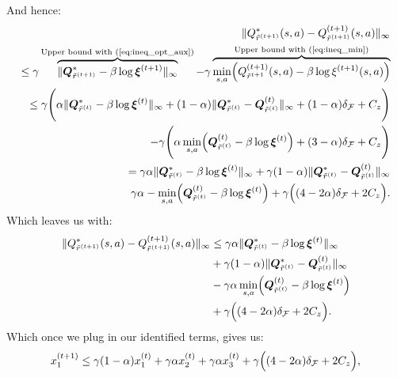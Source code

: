     And hence:
    \begin{align*}
        \| Q^*_{\tilde{r}^{(t+1)}}(s,a)
        -Q^{(t+1)}_{\tilde{r}^{(t+1)}}(s,a) \|_\infty \\
        \leq \gamma \overbrace{\| \bm{Q}_{\tilde{r}^{(t+1)}}^* - \beta \log \bm{\xi}^{(t+1)} \|_\infty }^\text{Upper bound with (\ref{eq:ineq_opt_aux})}
        - \gamma \overbrace{\min_{s,a} \Bigl(
            Q^{(t+1)}_{\tilde{r}^{t+1}}(s,a) - \beta \log \xi^{(t+1)}(s,a)
        \Bigr)}^\text{Upper bound with (\ref{eq:ineq_min})}\\
        \leq \gamma
        \Biggl(
            \alpha  \| \bm{Q}_{\tilde{r}^{(t)}}^* - \beta \log \bm{\xi}^{(t)} \|_\infty 
            + (1-\alpha) \|
                \bm{Q}_{\tilde{r}^{(t)}}^*  
                - {\bm{Q}}^{(t)}_{\tilde{r}^{(t)}} \|_\infty  
            + (1-\alpha) \delta_\mathcal{F} + C_z
        \Biggr) \\
        - \gamma \Biggl(
            \alpha \min_{s,a} \Bigl(\bm{Q}^{(t)}_{\tilde{r}^{(t)}} - \beta \log \bm{\xi}^{(t)}  \Bigr) + 
            (3-\alpha) \delta_\mathcal{F} + C_z    
        \Biggr) \\
        =
        \gamma \alpha \| \bm{Q}_{\tilde{r}^{(t)}}^* 
        - \beta \log \bm{\xi}^{(t)} \|_\infty 
        +\gamma(1-\alpha) \| \bm{Q}_{\tilde{r}^{(t)}}^*  
        - {\bm{Q}}^{(t)}_{\tilde{r}^{(t)}} \|_\infty  \\
        \gamma \alpha  -\min_{s,a} \Bigl(\bm{Q}^{(t)}_{\tilde{r}^{(t)}} - \beta \log \bm{\xi}^{(t)}  \Bigr) + 
        \gamma \Bigl(  (4-2\alpha)\delta_\mathcal{F}+2C_z  \Bigr).
    \end{align*}
    Which leaves us with:
    \begin{equation}
        \begin{aligned}
            \label{eq:ineq_q_subopt}
            \| Q^*_{\tilde{r}^{(t+1)}}(s,a)
            -Q^{(t+1)}_{\tilde{r}^{(t+1)}}(s,a) \|_\infty 
            &\leq
            \gamma \alpha \| \bm{Q}_{\tilde{r}^{(t)}}^* 
            - \beta \log \bm{\xi}^{(t)} \|_\infty \\ &
            +\gamma(1-\alpha) \| \bm{Q}_{\tilde{r}^{(t)}}^*  
            - {\bm{Q}}^{(t)}_{\tilde{r}^{(t)}} \|_\infty  \\ &
            -\gamma \alpha  \min_{s,a} \Bigl(\bm{Q}^{(t)}_{\tilde{r}^{(t)}} - \beta \log \bm{\xi}^{(t)}  \Bigr) \\ &
            +  \gamma \Bigl(  (4-2\alpha)\delta_\mathcal{F}+2C_z  \Bigr).
        \end{aligned}
    \end{equation}
    Which once we plug in our identified terms, gives us:
    \begin{equation}
        x_1^{(t+1)} \leq
        \gamma(1-\alpha)  x_1^{(t)}
        +\gamma \alpha x_2^{(t)}
        +\gamma \alpha  x_3^{(t)}
        + \gamma \Bigl(  (4-2\alpha)\delta_\mathcal{F}+2C_z  \Bigr), 
    \end{equation}


